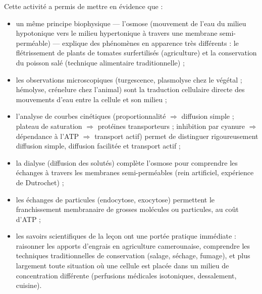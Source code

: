 \documentclass[11pt]{article}
\newcommand{\cle}[1]{{\popxbold\color{popdark}#1}}
\newcounter{popsec}
\newcounter{popsub}
\newcommand{\courssub}[1]{%
  \stepcounter{popsub}%
  \par\vspace{9pt}\noindent{\popxbold\fontsize{11.5}{13}\selectfont\color{popink}{\color{poporange}\thepopsec.\thepopsub}\hspace{6pt}#1}\par\nopagebreak\vspace{4pt}
}
\begin{document}
\courssub{Bilan de l'activité}

Cette activité a permis de mettre en évidence que :

\begin{itemize}
\item un même principe biophysique — l'\cle{osmose} (mouvement de l'eau du milieu hypotonique vers le milieu hypertonique à travers une membrane semi-perméable) — explique des phénomènes en apparence très différents : le flétrissement de plants de tomates surfertilisés (agriculture) et la conservation du poisson salé (technique alimentaire traditionnelle) ;
\item les observations microscopiques (turgescence, plasmolyse chez le végétal ; hémolyse, crénelure chez l'animal) sont la traduction cellulaire directe des mouvements d'eau entre la cellule et son milieu ;
\item l'analyse de courbes cinétiques (proportionnalité $\Rightarrow$ diffusion simple ; plateau de saturation $\Rightarrow$ protéines transporteurs ; inhibition par cyanure $\Rightarrow$ dépendance à l'ATP $\Rightarrow$ transport actif) permet de distinguer rigoureusement \cle{diffusion simple}, \cle{diffusion facilitée} et \cle{transport actif} ;
\item la \cle{dialyse} (diffusion des solutés) complète l'osmose pour comprendre les échanges à travers les membranes semi-perméables (rein artificiel, expérience de Dutrochet) ;
\item les échanges de particules (\cle{endocytose}, \cle{exocytose}) permettent le franchissement membranaire de grosses molécules ou particules, au coût d'ATP ;
\item les savoirs scientifiques de la leçon ont une portée pratique immédiate : raisonner les apports d'engrais en agriculture camerounaise, comprendre les techniques traditionnelles de conservation (salage, séchage, fumage), et plus largement toute situation où une cellule est placée dans un milieu de concentration différente (perfusions médicales isotoniques, dessalement, cuisine).
\end{itemize}
\end{document}
